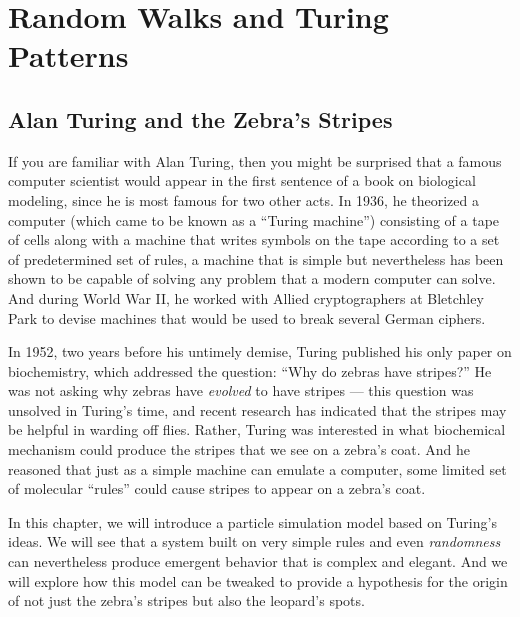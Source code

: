 \chapter[Random Walks and Turing Patterns]{Random Walks and Turing Patterns}
\label{chapter:turing}
\renewcommand{\chaptertitle}{Finding Motifs in Transcription Factor Networks}

\FloatBarrier

\section{Alan Turing and the Zebra’s Stripes}
\label{sec:introduction}

If you are familiar with Alan Turing, then you might be surprised that a famous computer scientist would appear in the first sentence of a book on biological modeling, since he is most famous for two other acts. In 1936, he theorized a computer (which came to be known as a ``Turing machine'') consisting of a tape of cells along with a machine that writes symbols on the tape according to a set of predetermined set of rules, a machine that is simple but nevertheless has been shown to be capable of solving any problem that a modern computer can solve.  And during World War II, he worked with Allied cryptographers at Bletchley Park to devise machines that would be used to break several German ciphers.

In 1952, two years before his untimely demise, Turing published his only paper on biochemistry, which addressed the question: “Why do zebras have stripes?” He was not asking why zebras have \textit{evolved} to have stripes --- this question was unsolved in Turing's time, and recent research has indicated that the stripes may be helpful in warding off flies. Rather, Turing was interested in what biochemical mechanism could produce the stripes that we see on a zebra's coat. And he reasoned that just as a simple machine can emulate a computer, some limited set of molecular ``rules'' could cause stripes to appear on a zebra's coat.

In this chapter, we will introduce a particle simulation model based on Turing's ideas. We will see that a system built on very simple rules and even \textit{randomness} can nevertheless produce emergent behavior that is complex and elegant. And we will explore how this model can be tweaked to provide a hypothesis for the origin of not just the zebra's stripes but also the leopard's spots.\\

